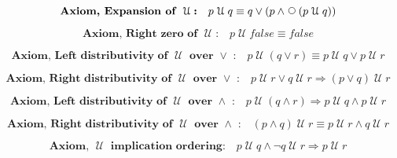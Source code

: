 \documentclass[12pt, fleqn, leqno]{article}
\newcommand{\impl}{\ensuremath{\Rightarrow}}        %
\newcommand{\Until}{\;\mathcal{U}\;}
\newcommand{\Next}{\;\,\text{\raisebox{3.5pt}{\circle{6}}}}
\newcommand{\spacer}{\vspace{-30pt}}
\newcommand{\firstspacer}{\vspace{-26pt}}
\begin{document}
\firstspacer

\begin{equation}\label{E:expansionUntil}
\textbf{Axiom, Expansion of $\Until$:}\quad p \Until q \equiv q \lor (p \land \Next (p \Until q))
\end{equation}

\spacer

\begin{equation}\label{E:untilFalse}
\textbf{Axiom, Right zero of $\Until$:}\quad p \Until false \equiv false
\end{equation}

\spacer

\begin{equation}\label{E:untilOrEquiv}
\textbf{Axiom, Left distributivity of $\Until$ over $\lor$ :}\quad p \Until (q \lor r) \equiv p \Until q \lor p \Until r
\end{equation}

\spacer

\begin{equation}\label{E:untilOrImp}
\textbf{Axiom, Right distributivity of $\Until$ over $\lor$ :}\quad p \Until r \lor q \Until r \impl (p \lor q) \Until r
\end{equation}

\spacer

\begin{equation}\label{E:untilAndImp}
\textbf{Axiom, Left distributivity of $\Until$ over $\land$ :}\quad p \Until (q \land r) \impl p \Until q \land p \Until r
\end{equation}

\spacer

\begin{equation}\label{E:untilAndEquiv}
\textbf{Axiom, Right distributivity of $\Until$ over $\land$ :}\quad (p \land q) \Until r \equiv p \Until r \land q \Until r
\end{equation}

\spacer

\begin{equation}\label{E:untilImplicationOrdering}
\textbf{Axiom, $\Until$ implication ordering:}\quad p \Until q \land \neg q \Until r \impl p \Until r
\end{equation}
\end{document}

